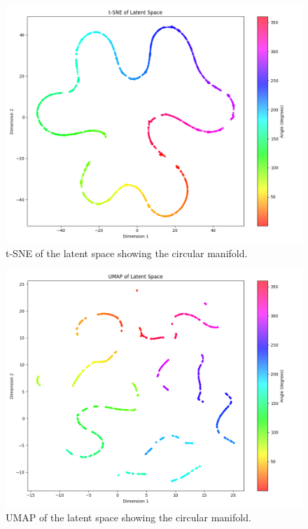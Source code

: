 \documentclass[11pt,a4paper]{article}
\begin{document}
\begin{figure}[h]
    \centering
    \includegraphics[width=0.8\linewidth]{results/tsne_latent_space.png}
    \caption{t-SNE of the latent space showing the circular manifold.}
    \label{fig:tsne_latent_space}
\end{figure}

\begin{figure}[h]
    \centering
    \includegraphics[width=0.8\linewidth]{results/umap_latent_space.png}
    \caption{UMAP of the latent space showing the circular manifold.}
    \label{fig:umap_latent_space}
\end{figure}
\end{document}
